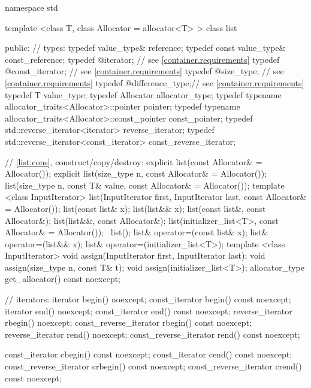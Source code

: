 \begin{codeblock}
namespace std {
  template <class T, class Allocator = allocator<T> >
  class list {
  public:
    // types:
    typedef value_type&                                             reference;
    typedef const value_type&                                       const_reference;
    typedef @\impdef@                iterator;       // see \ref{container.requirements}
    typedef @\impdef@                const_iterator; // see \ref{container.requirements}
    typedef @\impdef@                size_type;      // see \ref{container.requirements}
    typedef @\impdef@                difference_type;// see \ref{container.requirements}
    typedef T                                     value_type;
    typedef Allocator                             allocator_type;
    typedef typename allocator_traits<Allocator>::pointer           pointer;
    typedef typename allocator_traits<Allocator>::const_pointer     const_pointer;
    typedef std::reverse_iterator<iterator>       reverse_iterator;
    typedef std::reverse_iterator<const_iterator> const_reverse_iterator;

    // \ref{list.cons}, construct/copy/destroy:
    explicit list(const Allocator& = Allocator());
    explicit list(size_type n, const Allocator& = Allocator());
    list(size_type n, const T& value, const Allocator& = Allocator());
    template <class InputIterator>
      list(InputIterator first, InputIterator last, const Allocator& = Allocator());
    list(const list& x);
    list(list&& x);
    list(const list&, const Allocator&);
    list(list&&, const Allocator&);
    list(initializer_list<T>, const Allocator& = Allocator());
   ~list();
    list& operator=(const list& x);
    list& operator=(list&& x);
    list& operator=(initializer_list<T>);
    template <class InputIterator>
      void assign(InputIterator first, InputIterator last);
    void assign(size_type n, const T& t);
    void assign(initializer_list<T>);
    allocator_type get_allocator() const noexcept;

    // iterators:
    iterator               begin() noexcept;
    const_iterator         begin() const noexcept;
    iterator               end() noexcept;
    const_iterator         end() const noexcept;
    reverse_iterator       rbegin() noexcept;
    const_reverse_iterator rbegin() const noexcept;
    reverse_iterator       rend() noexcept;
    const_reverse_iterator rend() const noexcept;

    const_iterator         cbegin() const noexcept;
    const_iterator         cend() const noexcept;
    const_reverse_iterator crbegin() const noexcept;
    const_reverse_iterator crend() const noexcept;

}}
\end{codeblock}
